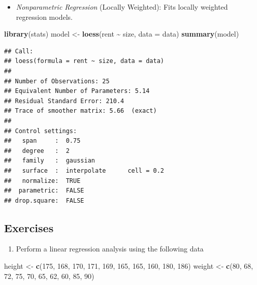 \documentclass[
]{article}
\newenvironment{Shaded}{\begin{snugshade}}{\end{snugshade}}
\newcommand{\AttributeTok}[1]{\textcolor[rgb]{0.13,0.29,0.53}{#1}}
\newcommand{\DecValTok}[1]{\textcolor[rgb]{0.00,0.00,0.81}{#1}}
\newcommand{\FunctionTok}[1]{\textcolor[rgb]{0.13,0.29,0.53}{\textbf{#1}}}
\newcommand{\NormalTok}[1]{#1}
\newcommand{\OtherTok}[1]{\textcolor[rgb]{0.56,0.35,0.01}{#1}}
\newcommand{\SpecialCharTok}[1]{\textcolor[rgb]{0.81,0.36,0.00}{\textbf{#1}}}
\providecommand{\tightlist}{%
  \setlength{\itemsep}{0pt}\setlength{\parskip}{0pt}}
\begin{document}
\begin{itemize}
\tightlist
\item
  \emph{Nonparametric Regression} (Locally Weighted): Fits locally
  weighted regression models.
\end{itemize}

\begin{Shaded}
\begin{Highlighting}[]
\FunctionTok{library}\NormalTok{(stats)}
\NormalTok{model }\OtherTok{\textless{}{-}} \FunctionTok{loess}\NormalTok{(rent }\SpecialCharTok{\textasciitilde{}}\NormalTok{ size, }\AttributeTok{data =}\NormalTok{ data)}
\FunctionTok{summary}\NormalTok{(model)}
\end{Highlighting}
\end{Shaded}

\begin{verbatim}
## Call:
## loess(formula = rent ~ size, data = data)
## 
## Number of Observations: 25 
## Equivalent Number of Parameters: 5.14 
## Residual Standard Error: 210.4 
## Trace of smoother matrix: 5.66  (exact)
## 
## Control settings:
##   span     :  0.75 
##   degree   :  2 
##   family   :  gaussian
##   surface  :  interpolate      cell = 0.2
##   normalize:  TRUE
##  parametric:  FALSE
## drop.square:  FALSE
\end{verbatim}

\hypertarget{exercises}{%
\subsection{Exercises}\label{exercises}}

\begin{enumerate}
\def\labelenumi{\arabic{enumi}.}
\tightlist
\item
  Perform a linear regression analysis using the following data
\end{enumerate}

\begin{Shaded}
\begin{Highlighting}[]
\NormalTok{height }\OtherTok{\textless{}{-}} \FunctionTok{c}\NormalTok{(}\DecValTok{175}\NormalTok{, }\DecValTok{168}\NormalTok{, }\DecValTok{170}\NormalTok{, }\DecValTok{171}\NormalTok{, }\DecValTok{169}\NormalTok{, }\DecValTok{165}\NormalTok{, }\DecValTok{165}\NormalTok{, }\DecValTok{160}\NormalTok{, }\DecValTok{180}\NormalTok{, }\DecValTok{186}\NormalTok{)}
\NormalTok{weight }\OtherTok{\textless{}{-}} \FunctionTok{c}\NormalTok{(}\DecValTok{80}\NormalTok{, }\DecValTok{68}\NormalTok{, }\DecValTok{72}\NormalTok{, }\DecValTok{75}\NormalTok{, }\DecValTok{70}\NormalTok{, }\DecValTok{65}\NormalTok{, }\DecValTok{62}\NormalTok{, }\DecValTok{60}\NormalTok{, }\DecValTok{85}\NormalTok{, }\DecValTok{90}\NormalTok{)}
\end{Highlighting}
\end{Shaded}
\end{document}

